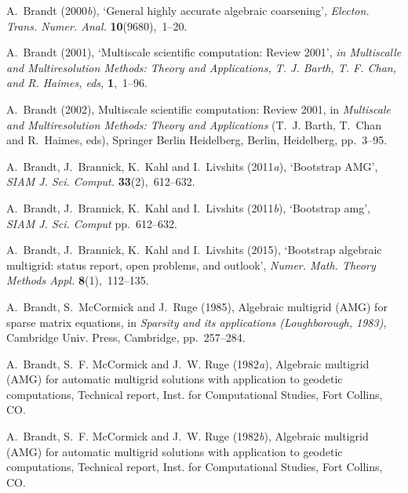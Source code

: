 \documentclass[12pt]{acta_2011xz}
\begin{document}
\begin{thebibliography}{xx}
A.~Brandt  (2000{\em b}), `General highly accurate algebraic coarsening', {\em
  Electon. Trans. Numer. Anal.} {\bf 10}(9680),~1--20.

A.~Brandt  (2001), `{Multiscale scientific computation: Review 2001}', {\em in
  Multiscalle and Multiresolution Methods: Theory and Applications, T. J.
  Barth, T. F. Chan, and R. Haimes, eds,} {\bf 1},~1--96.

A.~Brandt  (2002), Multiscale scientific computation: Review 2001, in {\em
  Multiscale and Multiresolution Methods: Theory and Applications} (T.~J.
  Barth, T.~Chan and R.~Haimes, eds), Springer Berlin Heidelberg, Berlin,
  Heidelberg, pp.~3--95.

A.~Brandt, J.~Brannick, K.~Kahl and I.~Livshits  (2011{\em a}), `Bootstrap
  {AMG}', {\em SIAM J. Sci. Comput.} {\bf 33}(2),~612--632.

A.~Brandt, J.~Brannick, K.~Kahl and I.~Livshits  (2011{\em b}), `Bootstrap
  amg', {\em SIAM J. Sci. Comput} pp.~612--632.

A.~Brandt, J.~Brannick, K.~Kahl and I.~Livshits  (2015), `Bootstrap algebraic
  multigrid: status report, open problems, and outlook', {\em Numer. Math.
  Theory Methods Appl.} {\bf 8}(1),~112--135.

A.~Brandt, S.~McCormick and J.~Ruge  (1985), Algebraic multigrid ({AMG}) for
  sparse matrix equations, in {\em Sparsity and its applications
  ({L}oughborough, 1983)}, Cambridge Univ. Press, Cambridge, pp.~257--284.

A.~Brandt, S.~F. McCormick and J.~W. Ruge  (1982{\em a}), Algebraic multigrid
  {(AMG)} for automatic multigrid solutions with application to geodetic
  computations, Technical report, Inst. for Computational Studies, Fort
  Collins, CO.

A.~Brandt, S.~F. McCormick and J.~W. Ruge  (1982{\em b}), Algebraic multigrid
  {(AMG)} for automatic multigrid solutions with application to geodetic
  computations, Technical report, Inst. for Computational Studies, Fort
  Collins, CO.


\end{thebibliography}
\end{document}
